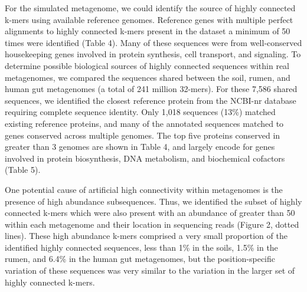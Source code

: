 \documentclass[10pt]{article}
\begin{document}
For the simulated metagenome, we could identify the source of highly
connected k-mers using available reference genomes. Reference genes
with multiple perfect alignments to highly connected k-mers present in
the dataset a minimum of 50 times were identified (Table 4).  Many of
these sequences were from well-conserved housekeeping genes involved
in protein synthesis, cell transport, and signaling.  To determine
possible biological sources of highly connected sequences within real
metagenomes, we compared the sequences shared between the soil, rumen,
and human gut metagenomes (a total of 241 million 32-mers).  For these 7,586 shared sequences, we identified the closest reference
protein from the NCBI-nr database requiring complete sequence
identity.  Only 1,018 sequences (13\%) matched existing reference
proteins, and many of the annotated sequences matched to
genes conserved across multiple genomes.  The top five
proteins conserved in greater than 3 genomes are shown in Table 4, and
largely encode for genes involved in protein biosynthesis, DNA
metabolism, and biochemical cofactors (Table 5).

One potential cause of artificial high connectivity within metagenomes
is the presence of high abundance subsequences.  Thus, we identified the
subset of highly connected k-mers which were also present with an
abundance of greater than 50 within each metagenome and their location
in sequencing reads (Figure 2, dotted lines).  These high abundance
k-mers comprised a very small proportion of the identified highly
connected sequences, less than 1\% in the soils, 1.5\% in the rumen,
and 6.4\% in the human gut metagenomes, but the position-specific
variation of these sequences was very similar to the variation in the
larger set of highly connected k-mers.
\end{document}
